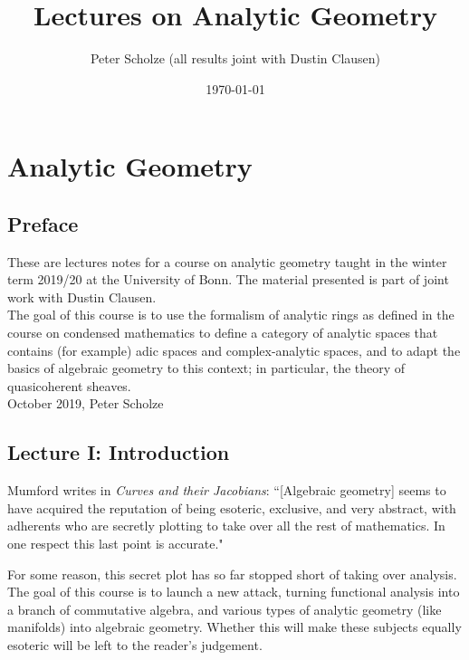 \documentclass[11pt]{amsbook}
\date{\today}
\title{Lectures on Analytic Geometry}
\author{Peter Scholze (all results joint with Dustin Clausen)}
\numberwithin{equation}{section}
\numberwithin{theorem}{section}
\theoremstyle{definition}
\begin{document}
\maketitle


\tableofcontents



\chapter*{Analytic Geometry}

\section*{Preface}

These are lectures notes for a course on analytic geometry taught in the winter term 2019/20 at the University of Bonn. The material presented is part of joint work with Dustin Clausen.\\

The goal of this course is to use the formalism of analytic rings as defined in the course on condensed mathematics to define a category of analytic spaces that contains (for example) adic spaces and complex-analytic spaces, and to adapt the basics of algebraic geometry to this context; in particular, the theory of quasicoherent sheaves.\\

\hfill{October 2019, Peter Scholze}

\newpage

\section{Lecture I: Introduction}

Mumford writes in \emph{Curves and their Jacobians}: ``[Algebraic geometry] seems to have acquired the reputation of being esoteric, exclusive, and very abstract, with adherents who are secretly plotting to take over all the rest of mathematics. In one respect this last point is accurate."

For some reason, this secret plot has so far stopped short of taking over analysis. The goal of this course is to launch a new attack, turning functional analysis into a branch of commutative algebra, and various types of analytic geometry (like manifolds) into algebraic geometry. Whether this will make these subjects equally esoteric will be left to the reader's judgement.
\end{document}
